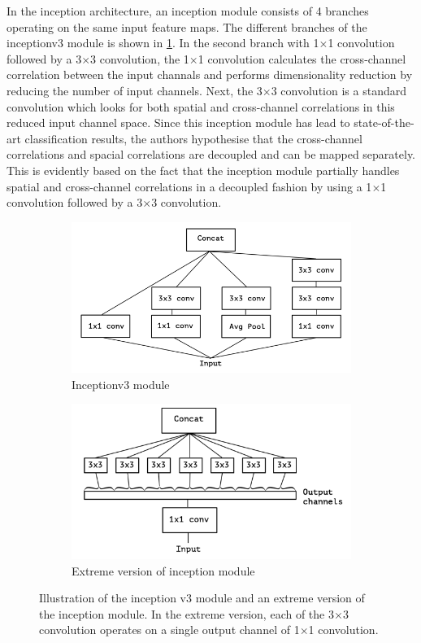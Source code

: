 In the inception architecture, an inception module consists of 4 branches operating on the same input feature maps. The different branches of the inceptionv3 module is shown in \ref{Fig:xceptiona}. In the second branch with 1$\times$1 convolution followed by a 3$\times$3 convolution, the 1$\times$1 convolution calculates the cross-channel correlation between the input channals and performs dimensionality reduction by reducing the number of input channels. Next, the 3$\times$3 convolution is a standard convolution which looks for both spatial and cross-channel correlations in this reduced input channel space. Since this inception module has lead to state-of-the-art classification results, the authors hypothesise that the cross-channel correlations and spacial correlations are decoupled and can be mapped separately. This is evidently based on the fact that the inception module partially handles spatial and cross-channel correlations in a decoupled fashion by using a 1$\times$1 convolution followed by a 3$\times$3 convolution. 

	\begin{figure}[!htb]
		\begin{subfigure}{.5\textwidth}
			\centering
			\includegraphics[width=.8\linewidth]{images/inception_v3}
			\caption{Inceptionv3 module}
			\label{Fig:xceptiona}
		\end{subfigure}
		\begin{subfigure}{.5\textwidth}
			\centering
			\includegraphics[width=.8\linewidth]{images/extreme_inception}
			\caption{Extreme version of inception module}
			\label{Fig:xceptionb}
		\end{subfigure}
		\caption{Illustration of the inception v3 module and an extreme version of the inception module. In the extreme version, each of the 3$\times$3 convolution operates on a single output channel of 1$\times$1 convolution.}
		\label{Fig:xception}
	\end{figure}


